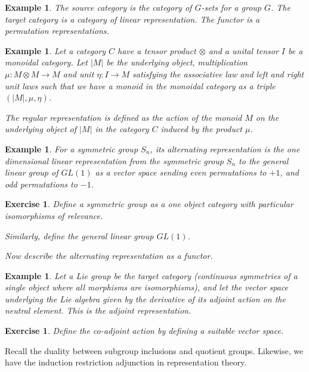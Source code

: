 \documentclass{tufte-book}
\newtheorem{example}[theorem]{Example}
\newtheorem{exercise}[theorem]{Exercise}
\begin{document}
\begin{example}
	The source category is the category of $G$-sets for a group $G$. The target category is a category of linear representation. The functor is a permutation representations.	
\end{example}

\begin{example}
	Let a category $C$ have a tensor product $\otimes$ and a unital tensor $I$ be a monoidal category. Let $|M|$ be the underlying object, multiplication $\mu : M \otimes M \rightarrow M$ and unit $\eta : I \rightarrow M$  satisfying the associative law and left and right unit laws such that we have a monoid in the monoidal category as a triple $(|M|, \mu, \eta)$.

	The regular representation is defined as the action of the monoid $M$ on the underlying object of $|M|$ in the category $C$ induced by the product $\mu$.
\end{example}

\begin{example}
	For a symmetric group $S_n$, its alternating representation is the one dimensional linear representation from the symmetric group $S_n$ to the general linear group of $GL(1)$ as a vector space sending even permutations to $+1$, and odd permutations to $-1$.
\end{example}

\begin{exercise}
	Define a symmetric group as a one object category with particular isomorphisms of relevance.

	Similarly, define the general linear group $GL(1)$.

	Now describe the alternating representation as a functor.
\end{exercise}

\begin{example}
	Let a Lie group be the target category (continuous symmetries of a single object where all morphisms are isomorphisms), and let the vector space underlying the Lie algebra given by the derivative of its adjoint action on the neutral element. This is the adjoint representation.
\end{example}

\begin{exercise}
	Define the co-adjoint action by defining a suitable vector space.
\end{exercise}

Recall the duality between subgroup inclusions and quotient groups. Likewise, we have the induction restriction adjunction in representation theory.
\end{document}
